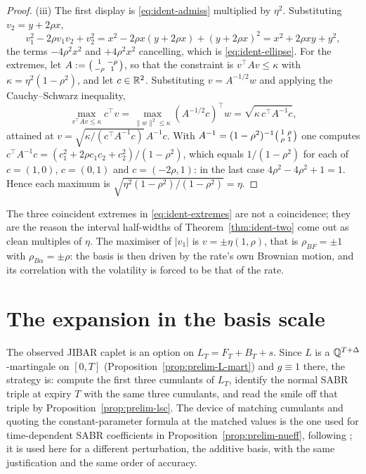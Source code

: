\documentclass[../../../main.tex]{subfiles}
\begin{document}
\begin{proof}
(iii) The first display is \eqref{eq:ident-admiss} multiplied by $\eta^2$. Substituting $v_2=y+2\rho x$,
\[
v_1^2-2\rho v_1v_2+v_2^2=x^2-2\rho x(y+2\rho x)+(y+2\rho x)^2=x^2+2\rho xy+y^2,
\]
the terms $-4\rho^2x^2$ and $+4\rho^2x^2$ cancelling, which is \eqref{eq:ident-ellipse}. For the extremes, let $A:=\begin{psmallmatrix}1&-\rho\\ -\rho&1\end{psmallmatrix}$, so that the constraint is $v^{\!\top}Av\le\kappa$ with $\kappa=\eta^2(1-\rho^2)$, and let $c\in\mathbb{R}^2$. Substituting $v=A^{-1/2}w$ and applying the Cauchy--Schwarz inequality,
\[
\max_{v^{\!\top}Av\le\kappa}c^{\!\top}v=\max_{\|w\|^2\le\kappa}(A^{-1/2}c)^{\!\top}w=\sqrt{\kappa\,c^{\!\top}A^{-1}c},
\]
attained at $v=\sqrt{\kappa/(c^{\!\top}A^{-1}c)}\,A^{-1}c$. With $A^{-1}=(1-\rho^2)^{-1}\begin{psmallmatrix}1&\rho\\ \rho&1\end{psmallmatrix}$ one computes $c^{\!\top}A^{-1}c=(c_1^2+2\rho c_1c_2+c_2^2)/(1-\rho^2)$, which equals $1/(1-\rho^2)$ for each of $c=(1,0)$, $c=(0,1)$ and $c=(-2\rho,1)$: in the last case $4\rho^2-4\rho^2+1=1$. Hence each maximum is $\sqrt{\eta^2(1-\rho^2)/(1-\rho^2)}=\eta$.
\end{proof}

The three coincident extremes in \eqref{eq:ident-extremes} are not a coincidence; they are the reason the interval half-widths of Theorem~\ref{thm:ident-two} come out as clean multiples of $\eta$. The maximiser of $|v_1|$ is $v=\pm\eta(1,\rho)$, that is $\rho_{BF}=\pm1$ with $\rho_{B\alpha}=\pm\rho$: the basis is then driven by the rate's own Brownian motion, and its correlation with the volatility is forced to be that of the rate.

\section{The expansion in the basis scale}\label{sec:ident-expansion}

The observed JIBAR caplet is an option on $L_T=F_T+B_T+s$. Since $L$ is a $\mathbb{Q}^{T+\Delta}$-martingale on $[0,T]$ (Proposition~\ref{prop:prelim-L-mart}) and $g\equiv1$ there, the strategy is: compute the first three cumulants of $L_T$, identify the normal SABR triple at expiry $T$ with the same three cumulants, and read the smile off that triple by Proposition~\ref{prop:prelim-lsc}. The device of matching cumulants and quoting the constant-parameter formula at the matched values is the one used for time-dependent SABR coefficients in Proposition~\ref{prop:prelim-nueff}, following \citep[App.~B]{hagan2002}; it is used here for a different perturbation, the additive basis, with the same justification and the same order of accuracy.
\end{document}
